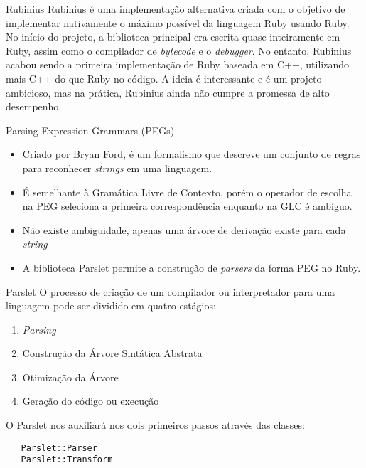 \documentclass{beamer}
\begin{document}

\begin{frame}{Rubinius}
Rubinius é uma implementação alternativa criada com o objetivo de implementar nativamente o máximo possível da linguagem Ruby usando Ruby.
No início do projeto, a biblioteca principal era escrita quase inteiramente em Ruby, assim como o compilador de \textit{bytecode} e o \textit{debugger}.
No entanto, Rubinius acabou sendo a primeira implementação de Ruby baseada em C++, utilizando mais C++ do que Ruby no código. A ideia é interessante e é um projeto ambicioso, mas na prática, Rubinius ainda não cumpre a promessa de alto desempenho.

\end{frame}


\begin{frame}{Parsing Expression Grammars (PEGs)}
\begin{itemize}
\item Criado por Bryan Ford, é um formalismo que descreve um conjunto de regras para reconhecer \textit{strings} em uma linguagem.
\item É semelhante à Gramática Livre de Contexto, porém o operador de escolha na PEG seleciona a primeira correspondência enquanto na GLC é ambíguo.
\item Não existe ambiguidade, apenas uma árvore de derivação existe para cada \textit{string}
\item A biblioteca Parslet permite a construção de \textit{parsers} da forma PEG no Ruby.
\end{itemize}
\end{frame}

\begin{frame}[fragile]{Parslet}
O processo de criação de um compilador ou interpretador para uma linguagem pode ser dividido em quatro estágios:

\begin{enumerate}
\item \textit{Parsing}
\item Construção da Árvore Sintática Abstrata
\item Otimização da Árvore
\item Geração do código ou execução
\end{enumerate}

O Parslet nos auxiliará nos dois primeiros passos através das classes:
\begin{verbatim}
   Parslet::Parser
   Parslet::Transform
\end{verbatim}

\end{frame}
\end{document}
